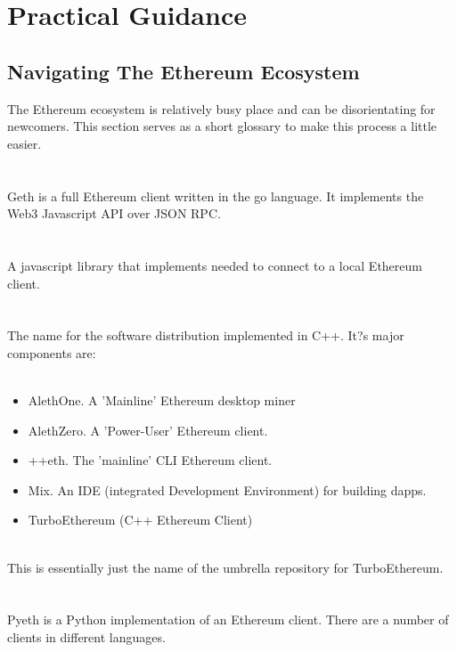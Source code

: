 
\chapter{Practical Guidance} %

\label{AppendixA} %

\section{Navigating The Ethereum Ecosystem}
The Ethereum ecosystem is relatively busy place and can be disorientating for newcomers. This section serves as a short glossary to make this process a little easier.\\
\\
\\
Geth is a full Ethereum client written in the go language. It implements the Web3 Javascript API over JSON RPC.\\
 \\
\\
A javascript library that implements needed to connect to a local Ethereum client.\\
\\
\\
The name for the software distribution implemented in C++. It?s major components are:\\
\\
\begin{itemize}
\item AlethOne. A 'Mainline' Ethereum desktop miner
\item AlethZero. A 'Power-User' Ethereum client.
\item ++eth. The 'mainline' CLI Ethereum client. 
\item Mix. An IDE (integrated Development Environment) for building dapps. 
\item TurboEthereum (C++ Ethereum Client)
\end{itemize}
\\
This is essentially just the name of the umbrella repository for TurboEthereum.\\
\\
\\
Pyeth is a Python implementation of an Ethereum client. There are a number of clients in different languages.\\
